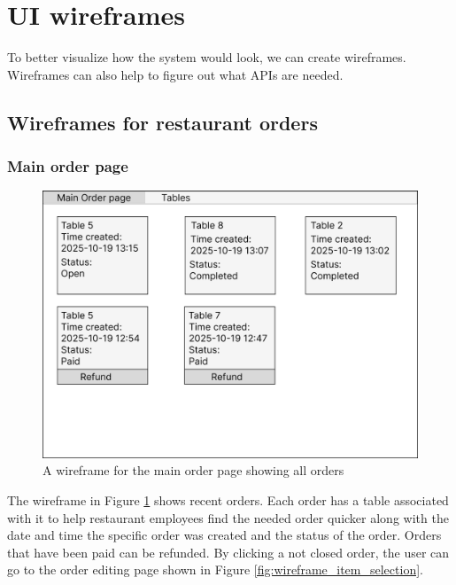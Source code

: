 \documentclass[11pt,a4paper,pdftex]{article}
\begin{document}
\section{UI wireframes}
To better visualize how the system would look, we can create wireframes. Wireframes can also help to figure out what APIs are needed.

\subsection{Wireframes for restaurant orders}

\subsubsection{Main order page}

\begin{figure}[H]
    \centering
    \includegraphics[width=1\linewidth]{wireframes/MainOrderPage.png}
    \caption{A wireframe for the main order page showing all orders}
    \label{fig:wireframe_main_order_page}
\end{figure}

The wireframe in Figure \ref{fig:wireframe_main_order_page} shows recent orders. Each order has a table associated with it to help restaurant employees find the needed order quicker along with the date and time the specific order was created and the status of the order. Orders that have been paid can be refunded. By clicking a not closed order, the user can go to the order editing page shown in Figure \ref{fig:wireframe_item_selection}.
\end{document}
